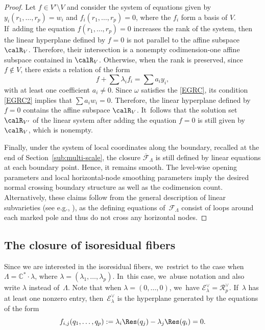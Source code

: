 \begin{proof}
Let $f\!\in\! V'\setminus V$ and consider the system of equations given by \hbox{$y_{i}(r_1,\ldots, r_p)=w_{i}$} and $f_{i}(r_1,\ldots, r_p)=0$, where the $f_{i}$ form a basis of $V$. If~adding the equation $f(r_1,\ldots, r_p)=0$ increases the rank of the system, then the linear hyperplane defined by $f = 0$ is not parallel to the affine subspace $\calR_V$. Therefore, their intersection is a nonempty codimension-one affine subspace contained in $\calR_{V}$. Otherwise, \ie when the rank is preserved, since $f\notin V$, there exists a relation of the form
\[
f+\sum \lambda_{i}f_{i} = \sum a_{i}y_{i},
\]
with at least one coefficient $a_{i}\neq 0$.
Since $\omega$ satisfies the \ref{EGRC}, its condition \eqref{EGRC2} implies that
$\sum a_{i} w_{i}=0$. Therefore, the linear hyperplane defined by $f = 0$ contains the affine subspace $\calR_V$. It~follows that
the solution set $\calR_{V'}$ of the linear system after adding the equation $f = 0$ is still given by $\calR_{V}$, which is nonempty.

Finally, under the system of local coordinates along the boundary, recalled at the end of Section~\ref{sub:multi-scale}, the closure $\overline{\mathcal{F}}_{\Lambda}$ is still defined by linear equations at each boundary point. Hence, it remains smooth. The level-wise opening parameters and local horizontal-node smoothing parameters imply the desired normal crossing boundary structure as well as the codimension count. Alternatively, these claims follow from the general description of linear subvarieties (see e.g., \cite[Cor.\,1.8]{BDG}), as the defining equations of~$\mathcal F_\Lambda$ consist of loops around each marked pole and thus do not cross any horizontal nodes.
\end{proof}

\subsection{The closure of isoresidual fibers}\label{sub:isoclosure}

Since we are interested in the isoresidual fibers, we~restrict to the case when $\Lambda = \mathbb{C}^{\ast} \cdot \lambda$, where $\lambda = (\lambda_1,\ldots, \lambda_p)$. In~this case, we~abuse notation and also write $\lambda$ instead of~$\Lambda$.
Note that when $\lambda=(0,\dots,0)$, we~have $\mathcal{E}_{\lambda}^{\vee}=\mathcal{R}_{p}^{\vee}$. If~$\lambda$ has at least one nonzero entry, then~$\mathcal{E}_{\lambda}^{\vee}$ is the hyperplane generated by the equations of the form
\begin{equation}\label{eq:relres}
f_{i,j}(q_{1},\dots,q_{p}):=\lambda_{i}\Res(q_{j})-\lambda_{j}\Res(q_{i})=0.
\end{equation}

